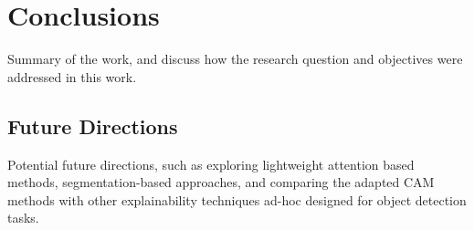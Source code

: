 \chapter{Conclusions}
Summary of the work, and discuss how the research question and objectives were addressed in this work. 

\section{Future Directions}
Potential future directions, such as exploring lightweight attention based methods, segmentation-based approaches, and comparing the adapted CAM methods with other explainability techniques ad-hoc designed for object detection tasks.